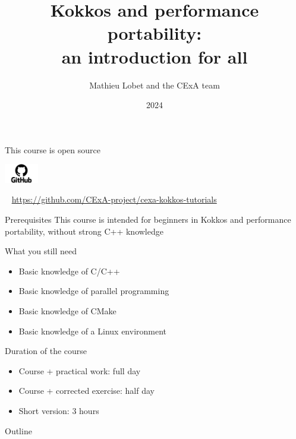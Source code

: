 \documentclass[aspectratio=169]{beamer}
\title[Kokkos and performance portability]{Kokkos and performance portability:\\an introduction for all}
\author{Mathieu Lobet and the CExA team}
\institute{CEA}
\date{2024}
\newcommand{\githublink}[2][2em]{%
    \hspace{-0.25em}%
    \parbox[c][#1][c]{#1}{%
        \includegraphics[width=#1]{GitHub-logo.png}%
    }%
    \hspace{-0.25em}%
    ~%
    #2%
}
\begin{document}
\begin{frame}[plain]
    \titlepage
\end{frame}


\begin{frame}{This course is open source}
    \begin{center}
        \githublink[4em]{\url{https://github.com/CExA-project/cexa-kokkos-tutorials}}
    \end{center}
\end{frame}


\begin{frame}{Prerequisites}
    This course is intended for beginners in Kokkos and performance portability, without strong C++ knowledge

    \vspace{1em}

    \begin{block}{What you still need}
        \begin{itemize}
            \item Basic knowledge of C/C++
            \item Basic knowledge of parallel programming
            \item Basic knowledge of CMake
            \item Basic knowledge of a Linux environment
        \end{itemize}
    \end{block}
\end{frame}


\begin{frame}{Duration of the course}
    \begin{itemize}
        \item Course + practical work: full day
        \item Course + corrected exercise: half day
        \item Short version: 3 hours
    \end{itemize}
\end{frame}

\begin{frame}{Outline}
    \tableofcontents[hidesubsections]
\end{frame}
\end{document}
